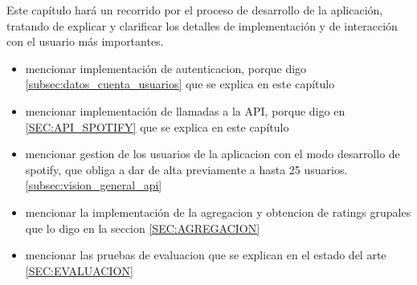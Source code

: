 Este capítulo hará un recorrido por el proceso de desarrollo de la aplicación, tratando de explicar y clarificar los 
detalles de implementación y de interacción con el usuario más importantes.

\begin{itemize}
    \item mencionar implementación de autenticacion, porque digo \ref{subsec:datos_cuenta_usuarios} que se explica en este capítulo
    \item mencionar implementación de llamadas a la API, porque digo en \ref{SEC:API_SPOTIFY} que se explica en este capítulo
    \item mencionar gestion de los usuarios de la aplicacion con el modo desarrollo de spotify,
    que obliga a dar de alta previamente a hasta 25 usuarios. \ref{subsec:vision_general_api}
    \item mencionar la implementación de la agregacion y obtencion de ratings grupales que lo digo en la seccion 
    \ref{SEC:AGREGACION}
    \item mencionar las pruebas de evaluacion que se explican en el estado del arte \ref{SEC:EVALUACION}
\end{itemize}
